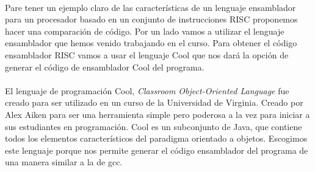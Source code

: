 \documentclass[10pt,a4paper]{article}
\begin{document}
\paragraph{}
Pare tener un ejemplo claro de las características de un lenguaje ensamblador para un procesador basado en un conjunto de instrucciones RISC proponemos hacer una comparación de código. Por un lado vamos a utilizar el lenguaje ensamblador que hemos venido trabajando en el curso. Para obtener el código ensamblador RISC vamos a usar el lenguaje Cool que nos dará la opción de generar el código de ensamblador Cool del programa.
\paragraph{}
El lenguaje de programación Cool, \textit{Classroom Object-Oriented Language} fue creado para ser utilizado en un curso de la Universidad de Virginia. Creado por Alex Aiken para ser una herramienta simple pero poderosa a la vez para iniciar a sus estudiantes en programación. Cool es un subconjunto de Java, que contiene todos los elementos característicos del paradigma orientado a objetos. Escogimos este lenguaje porque nos permite generar el código ensamblador del programa de una manera similar a la de gcc.
\end{document}
